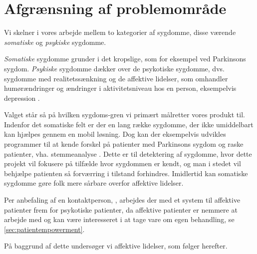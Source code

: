 \section{Afgrænsning af problemområde}
Vi skelner i vores arbejde mellem to kategorier af sygdomme, disse værende \textit{somatiske} og \textit{psykiske} sygdomme.

\textit{Somatiske} sygdomme grunder i det kropslige, som for eksempel ved Parkinsons sygdom.
\textit{Psykiske} sygdomme dækker over de psykotiske sygdomme, dvs. sygdomme med realitetssænkning og de affektive lidelser, som omhandler humørændringer og ændringer i aktivitetsniveau hos en person, eksempelvis depression \citep{misc:netpsykpsykose}. 

Valget står så på hvilken sygdoms-gren vi primært målretter vores produkt til.
Indenfor det somatiske felt er der en lang række sygdomme, der ikke umiddelbart kan hjælpes gennem en mobil løsning.
Dog kan der eksempelvis udvikles programmer til at kende forskel på patienter med Parkinsons sygdom og raske patienter, vha. stemmeanalyse \citep{6168572}.
Dette er til detektering af sygdomme, hvor dette projekt vil fokusere på tilfælde hvor sygdommen er kendt, og man i stedet vil behjælpe patienten så forværring i tilstand forhindres.
Imidlertid kan somatiske sygdomme gøre folk mere sårbare overfor affektive lidelser.

Per anbefaling af en kontaktperson, \citet{misc:janne-rasmussen}, arbejdes der med et system til affektive patienter frem for psykotiske patienter, da affektive patienter er nemmere at arbejde med og kan være interesseret i at tage vare om egen behandling, se \cref{sec:patientempowerment}.

På baggrund af dette undersøger vi affektive lidelser, som følger herefter.